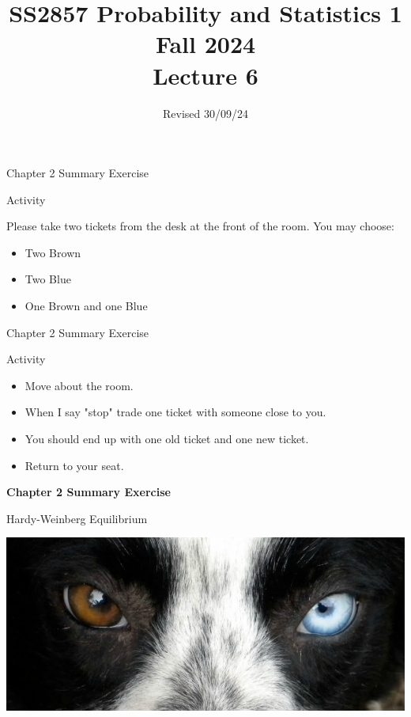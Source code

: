 \documentclass[aspectratio=169,xcolor=pdftex,dvipsnames,table]{beamer}\usepackage[]{graphicx}\usepackage[]{xcolor}
\title[SS2857 -- Lecture 6]{SS2857 Probability and Statistics 1\\
  Fall 2024\\
  \vspace{.2in}
  Lecture 6}
\date{Revised 30/09/24}
\begin{document}
{

\begin{frame}
  \maketitle
\end{frame}
}


\begin{frame}{Chapter 2 Summary Exercise}
  \begin{block}{Activity}
  
  Please take two tickets from the desk at the front of the room. You may choose:
  \begin{itemize}
  \item Two Brown
  \item Two Blue
  \item One Brown and one Blue
  \end{itemize}
  \end{block}
\end{frame}

\begin{frame}{Chapter 2 Summary Exercise}
  \begin{block}{Activity}
  
  
  \begin{itemize}
  \item Move about the room.
  \item  When I say "stop" trade one ticket with someone close to you.
  \item You should end up with one old ticket and one new ticket.
  \item Return to your seat.
  \end{itemize}
  \end{block}
\end{frame}

\begin{frame}
  \begin{center}
    \Large{\textbf{Chapter 2 Summary Exercise}}
    
    \Large{Hardy-Weinberg Equilibrium}

    \includegraphics[height = .6\textheight]{1412513462}
  \end{center}
\end{frame}
\end{document}
